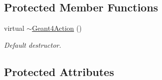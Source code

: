 \subsection*{Protected Member Functions}
\begin{DoxyCompactItemize}
\item 
virtual \hyperlink{class_d_d4hep_1_1_simulation_1_1_geant4_action_af1ba7438be6c70743727ce6606c5f76a}{$\sim$\+Geant4\+Action} ()
\begin{DoxyCompactList}\small\item\em Default destructor. \end{DoxyCompactList}\end{DoxyCompactItemize}
\subsection*{Protected Attributes}
